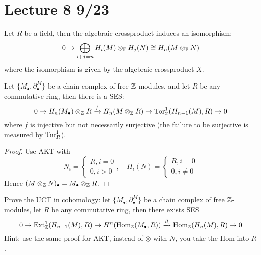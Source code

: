 \section{Lecture 8 9/23}
\begin{cor}
    Let $R$ be a field, then the algebraic crossproduct induces an isomorphism:
    \begin{equation*}
        0\to\bigoplus_{i+j=n}H_i(M)\otimes_{\mathbb{F}} H_j(N)\cong H_n(M\otimes_{\mathbb{F}} N)
    \end{equation*}
    where the isomorphism is given by the algebraic crossproduct $X$.
\end{cor}
\begin{cor}
    Let $\{M_\bullet,\partial_\bullet^M\}$ be a chain complex of free $\mathbb{Z}$-modules, and let $R$ be any commutative ring, then there is a SES:
    \begin{equation*}
        0\to H_n(M_\bullet)\otimes_{\mathbb{Z}} R\xrightarrow{f} H_n(M\otimes_{\mathbb{Z}} R)\to \text{Tor}_{\mathbb{Z}}^1(H_{n-1}(M),R)\to 0
    \end{equation*}
    where $f$ is injective but not necessarily surjective (the failure to be surjective is measured by $\text{Tor}_R^1$).
\end{cor}
\begin{proof}
    Use AKT with 
    \begin{equation*}
        N_i=\begin{cases}
            R, i=0\\
            0, i>0
        \end{cases}, \quad 
        H_i(N)=\begin{cases}
            R, i=0\\
            0, i\neq 0
        \end{cases}
    \end{equation*}
    Hence $(M\otimes_{\mathbb{Z}} N)_\bullet =M_\bullet\otimes_{\mathbb{Z}} R$.
\end{proof}
\begin{prob}[HW(2.7)]
    Prove the UCT in cohomology: let $\{M_\bullet, \partial_\bullet^M\}$ be a chain complex of free $\mathbb{Z}$-modules, let $R$ be any commutative ring, then there exists SES 
    \begin{equation*}
        0\to \text{Ext}_{\mathbb{Z}}^1(H_{n-1}(M),R)\to H^n(\text{Hom}_{\mathbb{Z}}(M_\bullet,R))\xrightarrow{\beta}\text{Hom}_{\mathbb{Z}}(H_n(M),R)\to 0
    \end{equation*}
    Hint: use the same proof for AKT, instead of $\otimes$ with $N$, you take the Hom into $R$.
\end{prob}


